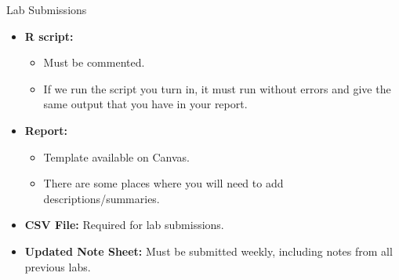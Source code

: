 \documentclass{beamer}
\begin{document}
\begin{frame}{Lab Submissions}
    \begin{itemize}
        \item \textbf{R script:}
        \begin{itemize}
            \item Must be commented.
            \item If we run the script you turn in, it must run without errors and give the same output that you have in your report.
        \end{itemize}

        \item \textbf{Report:}
        \begin{itemize}
            \item Template available on Canvas.
            \item There are some places where you will need to add descriptions/summaries.
        \end{itemize}

        \item \textbf{CSV File:} Required for lab submissions.

        \item \textbf{Updated Note Sheet:} Must be submitted weekly, including notes from all previous labs.
    \end{itemize}
\end{frame}
\end{document}
